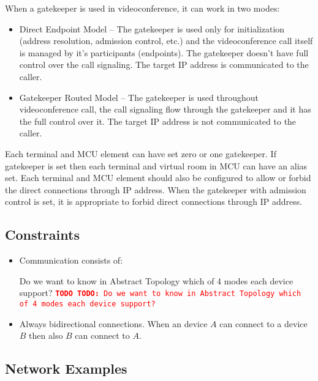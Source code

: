 \documentclass[a4paper]{report}
\newcommand{\TODO}[1]{%
\def\empty{}%
\def\prvniparametr{#1}%
\ifx\prvniparametr\empty%
\begingroup\tt\textcolor{red}{\noindent\textbf{TODO}}\endgroup
\else%
\begingroup\tt\textcolor{red}{\noindent\textbf{TODO:}\ #1}\endgroup
\fi%
}
\begin{document}
When a gatekeeper is used in videoconference, it can work in two modes:
\begin{itemize}
\item Direct Endpoint Model -- The gatekeeper is used only for initialization (address resolution, admission control, etc.) and the videoconference call itself is managed by it's participants (endpoints). The gatekeeper doesn't have full control over the call signaling. The target IP address is communicated to the caller.
\item Gatekeeper Routed Model -- The gatekeeper is used throughout videoconference call, the call signaling flow through the gatekeeper and it has the full control over it. The target IP address is not communicated to the caller.
\end{itemize}

Each terminal and MCU element can have set zero or one gatekeeper. If gatekeeper is set then each terminal and virtual room in MCU can have an alias set. Each terminal and MCU element should also be configured to allow or forbid the direct connections through IP address. When the gatekeeper with admission control is set, it is appropriate to forbid direct connections through IP address.

\subsection{Constraints}

\begin{itemize}

\item Communication consists of:
\TODO{Do we want to know in Abstract Topology which of 4 modes each device support?}

\item Always bidirectional connections. When an device $A$ can connect to a device $B$ then also $B$ can connect to $A$.

\end{itemize}

\subsection{Network Examples}
\end{document}

